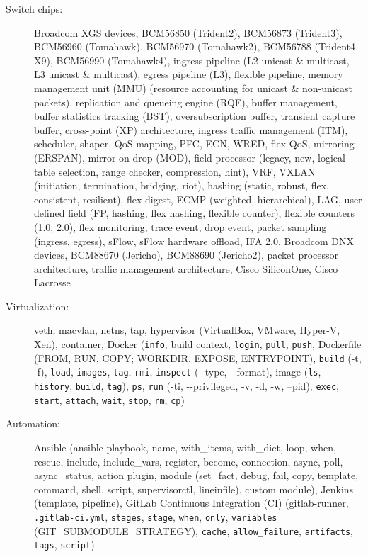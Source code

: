 \documentclass[letterpaper,11pt]{article}
\begin{document}
\begin{CJK}{UTF8}{gbsn}
\begin{description}
\item[Switch chips:] Broadcom XGS devices, BCM56850 (Trident2), BCM56873 (Trident3), BCM56960 (Tomahawk), BCM56970 (Tomahawk2),
BCM56788 (Trident4 X9), BCM56990 (Tomahawk4), ingress pipeline (L2 unicast \& multicast, L3 unicast \& multicast), egress pipeline (L3),
flexible pipeline, memory management unit (MMU) (resource accounting for unicast \& non-unicast packets), replication and queueing engine (RQE),
buffer management, buffer statistics tracking (BST), oversubscription buffer, transient capture buffer,
cross-point (XP) architecture, ingress traffic management (ITM), scheduler, shaper, QoS mapping, PFC, ECN, WRED, flex QoS,
mirroring (ERSPAN), mirror on drop (MOD),
field processor (legacy, new, logical table selection, range checker, compression, hint),
VRF, VXLAN (initiation, termination, bridging, riot),
hashing (static, robust, flex, consistent, resilient), flex digest, ECMP (weighted, hierarchical), LAG,
user defined field (FP, hashing, flex hashing, flexible counter), flexible counters (1.0, 2.0), flex monitoring,
trace event, drop event,
packet sampling (ingress, egress), sFlow, sFlow hardware offload, IFA 2.0,
Broadcom DNX devices, BCM88670 (Jericho), BCM88690 (Jericho2), packet processor architecture, traffic management architecture,
Cisco SiliconOne,
Cisco Lacrosse

\item[Virtualization:] veth, macvlan, netns, tap, hypervisor (VirtualBox, VMware, Hyper-V, Xen), container, Docker ({\tt info},
build context, {\tt login}, {\tt pull}, {\tt push},
Dockerfile (FROM, RUN, COPY; WORKDIR, EXPOSE, ENTRYPOINT), {\tt build} (-t, -f),
{\tt load}, {\tt images}, {\tt tag}, {\tt rmi}, {\tt inspect} (-{}-type, -{}-format),
image ({\tt ls}, {\tt history}, {\tt build}, {\tt tag}),
{\tt ps}, {\tt run} (-ti, -{}-privileged, -v, -d, -w, --pid), {\tt exec}, {\tt start}, {\tt attach}, {\tt wait}, {\tt stop}, {\tt rm},
{\tt cp})

\item[Automation:] Ansible (ansible-playbook, name, with\_items, with\_dict, loop, when, rescue, include, include\_vars, register, become, connection,
async, poll, async\_status, action plugin,
module (set\_fact, debug, fail, copy, template, command, shell, script, supervisorctl, lineinfile), custom module),
Jenkins (template, pipeline), GitLab Continuous Integration (CI) (gitlab-runner, {\tt .gitlab-ci.yml}, {\tt stages}, {\tt stage},
{\tt when}, {\tt only}, {\tt variables} (GIT\_SUBMODULE\_STRATEGY), {\tt cache}, {\tt allow\_failure}, {\tt artifacts}, {\tt tags}, {\tt script})


\end{description}
\end{CJK}
\end{document}
